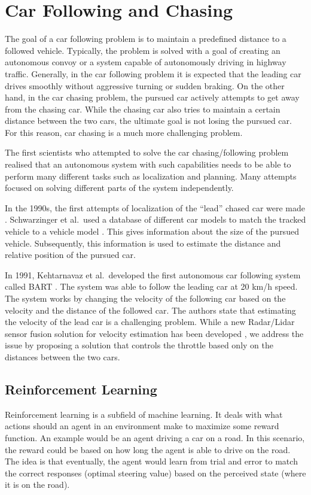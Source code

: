 \documentclass{ctuthesis/ctuthesis}
\begin{document}
\section{Car Following and Chasing}
The goal of a car following problem is to maintain a predefined distance to a followed vehicle. Typically, the problem is solved with a goal of creating an autonomous convoy or a system capable of autonomously driving in highway traffic. Generally, in the car following problem it is expected that the leading car drives smoothly without aggressive turning or sudden braking. On the other hand, in the car chasing problem, the pursued car actively attempts to get away from the chasing car. While the chasing car also tries to maintain a certain distance between the two cars, the ultimate goal is not losing the pursued car. For this reason, car chasing is a much more challenging problem. \par



The first scientists who attempted to solve the car chasing/following problem realised that an autonomous system with such capabilities needs to be able to perform many different tasks such as localization and planning. Many attempts focused on solving different parts of the system independently.\par

In the 1990s, the first attempts of localization of the ``lead'' chased car were made \cite{only_detection_and_tracking,also_only_car_tracking,night}. Schwarzinger et al.\ used a database of different car models to match the tracked vehicle to a vehicle model \cite{only_detection_and_tracking}. This gives information about the size of the pursued vehicle. Subsequently, this information is used to estimate the distance and relative position of the pursued car.


In 1991, Kehtarnavaz et al.\ developed the first autonomous car following system called BART \cite{BART_car_following}. The system was able to follow the leading car at 20 km/h speed. The system works by changing the velocity of the following car based on the velocity and the distance of the followed car. The authors state that estimating the velocity of the lead car is a challenging problem. While a new Radar/Lidar sensor fusion solution for velocity estimation has been developed \cite{lidar_highway}, we address the issue by proposing a solution that controls the throttle based only on the distances between the two cars.


\subsection{Reinforcement Learning}
Reinforcement learning is a subfield of machine learning. It deals with what actions should an agent in an environment make to maximize some reward function. An example would be an agent driving a car on a road. In this scenario, the reward could be based on how long the agent is able to drive on the road. The idea is that eventually, the agent would learn from trial and error to match the correct responses (optimal steering value) based on the perceived state (where it is on the road).\par
\end{document}
